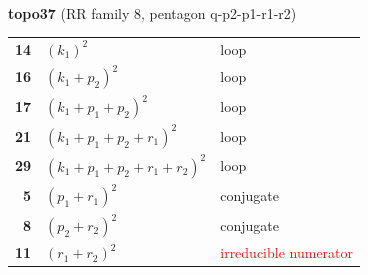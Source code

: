 \documentclass[10pt]{article}
\begin{document}
\begin{minipage}[t]{0.48\textwidth}
{}\\[2mm]\textbf{topo37} (RR family 8, pentagon q-p2-p1-r1-r2)\\[2pt]{\footnotesize\begin{tabular}{@{}r@{\ \ }l@{\ \ }l@{}}\textbf{14} & $(k_1)^2$ & loop\\
\textbf{16} & $(k_1+p_2)^2$ & loop\\
\textbf{17} & $(k_1+p_1+p_2)^2$ & loop\\
\textbf{21} & $(k_1+p_1+p_2+r_1)^2$ & loop\\
\textbf{29} & $(k_1+p_1+p_2+r_1+r_2)^2$ & loop\\
\textbf{5} & $(p_1+r_1)^2$ & conjugate\\
\textbf{8} & $(p_2+r_2)^2$ & conjugate\\
\textbf{11} & $(r_1+r_2)^2$ & \textcolor{red}{irreducible numerator}\\\end{tabular}}\end{minipage}\hfill%
\end{document}
